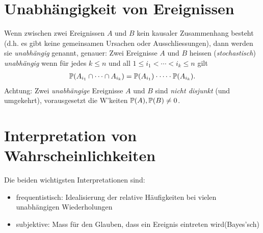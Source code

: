 \section{Unabhängigkeit von Ereignissen}
Wenn zwischen zwei Ereignissen $A$ und $B$ kein kausaler Zusammenhang besteht (d.h. es gibt keine gemeinsamen Ursachen oder Ausschliessungen), dann werden sie \emph{unabhängig} genannt, genauer: Zwei Ereignisse $A$ und $B$ heissen (\emph{stochastisch}) \emph{unabhängig} wenn für jedes $k\leq n$ und all $1\leq i_1< \cdots < i_k \leq n$ gilt
\begin{gather*}
	\mathbb P(A_{i_1}\cap \cdots \cap A_{i_{k}})=\mathbb P(A_{i_1})\cdot\cdots\cdot \mathbb P(A_{i_k}).
\end{gather*}
Achtung: Zwei \emph{unabhängige} Ereignisse $A$ und $B$ sind \emph{nicht disjunkt} (und umgekehrt), vorausgesetzt die W'keiten $\mathbb P(A), \mathbb P(B) \neq 0$.

\section{Interpretation von Wahrscheinlichkeiten}
Die beiden wichtigsten Interpretationen sind:
\begin{itemize}
	\item frequentistisch: \glqq Idealisierung der relative Häufigkeiten bei vielen unabhängigen Wiederholungen\grqq
	\item subjektive: \glqq Mass für den Glauben, dass ein Ereignis eintreten wird\grqq (Bayes'sch)
\end{itemize}

